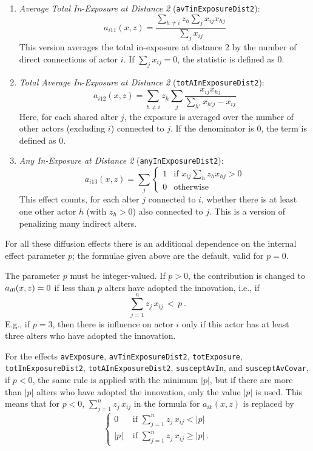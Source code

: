 \documentclass[a4paper,fleqn,11pt]{article}
\newcommand{\+}{\, + \,}
\newcommand{\vit}{\theenumi}
\begin{document}
\begin{enumerate}
    Multiple versions of averaging have been implemented:

\item \emph{Average Total In-Exposure at Distance 2} (\verb|avTinExposureDist2|):
\[
      a_{i11}(x, z) = \frac{\sum_{h \neq i} z_h \sum_{j} x_{ij} x_{hj}}{\sum_{j} x_{ij}}
\]
This version averages the total in-exposure at distance 2 by the number of direct
connections of actor $i$. If $\sum_{j}x_{ij}=0$, the statistic is defined as 0.

\item\emph{Total Average In-Exposure at Distance 2} (\verb|totAInExposureDist2|):
\[
      a_{i12}(x, z) = \sum_{h \neq i} z_h \sum_{j}\frac{ x_{ij} x_{hj}}{\sum_{h'}
            x_{h'j} - x_{ij}}
\]
Here, for each shared alter $j$, the exposure is averaged over the number of other
actors (excluding $i$) connected to $j$. If the denominator is 0, the term is
defined as 0.


\item\emph{Any In-Exposure at Distance 2} (\verb|anyInExposureDist2|):
\[
      a_{i13}(x, z) = \sum_{j}
      \begin{cases}
      1  & \text{if } x_{ij} \sum_{h} z_h  x_{hj} > 0 \\
      0 & \text{otherwise}
      \end{cases}
\]
This effect counts, for each alter $j$ connected to $i$, whether there is at
least one other actor $h$ (with $z_h>0$) also connected to $j$. This is a
version of penalizing many indirect alters.

\end{enumerate}

For all  these diffusion effects there is an additional dependence
on the internal effect parameter $p$; the formulae given above are the default,
valid for $p=0$.

The parameter $p$ must be integer-valued. If $p > 0$, the contribution is
changed to $a_{i\vit}(x, z) = 0$ if less than $p$ alters
have adopted the innovation, i.e., if
\[
\sum_{j=1}^n  z_j\, x_{ij} \, < \, p \ .
\]
E.g., if $p=3$, then there is influence on actor $i$ only if
this actor has at least three alters who have adopted the innovation.

For the effects \verb|avExposure|, \verb|avTinExposureDist2|, \verb|totExposure|,
\verb|totInExposureDist2|, \verb|totAInExposureDist2|, \verb|susceptAvIn|,
and \verb|susceptAvCovar|, \\
if $p < 0$, the same rule is applied with the minimum $|p|$, but if there
are more than $|p|$ alters who have adopted the innovation,
only the value $|p|$ is used.
This means that for $p < 0$,
$\sum_{j=1}^n  z_j\, x_{ij}$ in the formula for
 $a_{ik}(x, z) $ is replaced by
 \[
 \left\{ \begin{array}{ll}
                0 & \text{  if  } \sum_{j=1}^n  z_j\, x_{ij} < |p| \\[0.9ex]
                |p| & \text{  if  } \sum_{j=1}^n  z_j\, x_{ij} \geq |p| \ .
     \end{array} \right.
 \]
\end{document}
